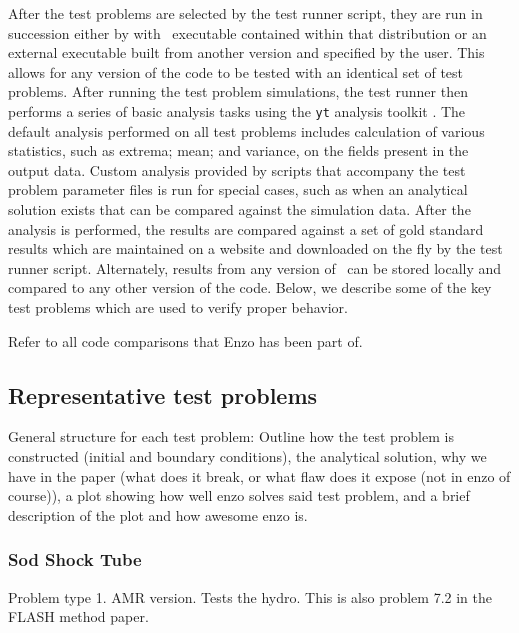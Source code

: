 After the test problems are selected by the test runner script, they
are run in succession either by with \enzo\ executable contained within
that distribution or an external executable built from another version
and specified by the user.  This allows for any version of the code to
be tested with an identical set of test problems.  After running the
test problem simulations, the test runner then performs a series of
basic analysis tasks using the \texttt{yt} analysis toolkit
\citep{2011ApJS..192....9T, 2011arXiv1112.4482T}.  The default
analysis performed on all test problems includes calculation of
various statistics, such as extrema; mean; and variance, on the fields
present in the output data.  Custom analysis provided by scripts that
accompany the test problem parameter files is run for special cases,
such as when an analytical solution exists that can be compared
against the simulation data.  After the analysis is performed, the
results are compared against a set of gold standard results which are
maintained on a website and downloaded on the fly by the test runner
script.  Alternately, results from any version of \enzo\ can be stored
locally and compared to any other version of the code.  Below, we
describe some of the key test problems which are used to verify proper 
behavior.

 Refer to all code comparisons that Enzo has been part of.

\subsection{Representative test problems}
\label{sec.tests.problems}

General structure for each test problem:  Outline how the test problem is constructed (initial and boundary conditions), 
the analytical solution, why we have in the paper (what does it break, or what flaw does it expose (not in enzo of course)),
a plot showing how well enzo solves said test problem, and a brief description of the plot and how awesome enzo is.

\subsubsection{Sod Shock Tube}
\label{sec.tests.sodshock}
Problem type 1.  AMR version.  Tests the hydro.
This is also problem 7.2 in the FLASH method paper.


